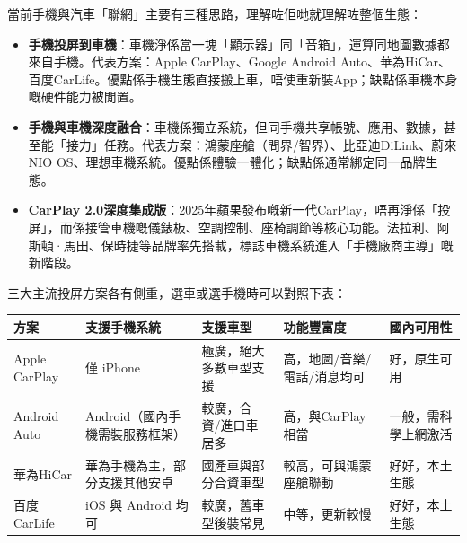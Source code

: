 


當前手機與汽車「聯網」主要有三種思路，理解咗佢哋就理解咗整個生態：

\begin{itemize}
  \item \textbf{手機投屏到車機}：車機淨係當一塊「顯示器」同「音箱」，運算同地圖數據都來自手機。代表方案：Apple CarPlay、Google Android Auto、華為HiCar、百度CarLife。優點係手機生態直接搬上車，唔使重新裝App；缺點係車機本身嘅硬件能力被閒置。
  \item \textbf{手機與車機深度融合}：車機係獨立系統，但同手機共享帳號、應用、數據，甚至能「接力」任務。代表方案：鴻蒙座艙（問界/智界）、比亞迪DiLink、蔚來NIO OS、理想車機系統。優點係體驗一體化；缺點係通常綁定同一品牌生態。
  \item \textbf{CarPlay 2.0深度集成版}：2025年蘋果發布嘅新一代CarPlay，唔再淨係「投屏」，而係接管車機嘅儀錶板、空調控制、座椅調節等核心功能。法拉利、阿斯頓·馬田、保時捷等品牌率先搭載，標誌車機系統進入「手機廠商主導」嘅新階段。
\end{itemize}


三大主流投屏方案各有側重，選車或選手機時可以對照下表：

\begin{center}
\begin{tabularx}{\linewidth}{|X|X|X|X|X|}
\hline
\textbf{方案} & \textbf{支援手機系統} & \textbf{支援車型} & \textbf{功能豐富度} & \textbf{國內可用性} \tabularnewline
\hline
Apple CarPlay & 僅 iPhone & 極廣，絕大多數車型支援 & 高，地圖/音樂/電話/消息均可 & 好，原生可用 \tabularnewline
Android Auto & Android（國內手機需裝服務框架） & 較廣，合資/進口車居多 & 高，與CarPlay相當 & 一般，需科學上網激活 \tabularnewline
華為HiCar & 華為手機為主，部分支援其他安卓 & 國產車與部分合資車型 & 較高，可與鴻蒙座艙聯動 & 好好，本土生態 \tabularnewline
百度CarLife & iOS 與 Android 均可 & 較廣，舊車型後裝常見 & 中等，更新較慢 & 好好，本土生態 \tabularnewline
\hline
\end{tabularx}
\end{center}


